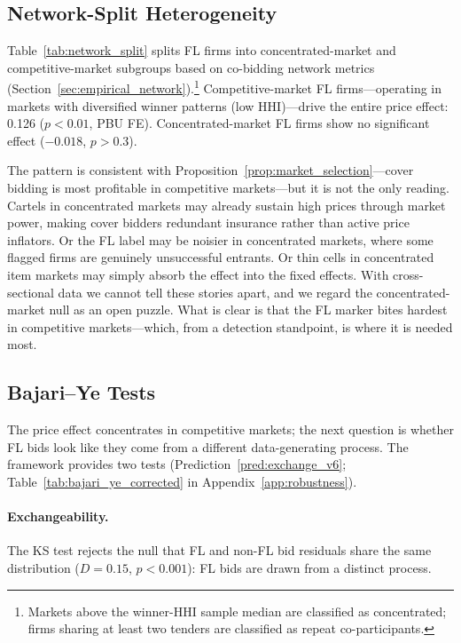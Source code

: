 \subsection{Network-Split Heterogeneity}
\label{sec:results_network}

Table~\ref{tab:network_split} splits FL firms into
concentrated-market and competitive-market subgroups based on
co-bidding network metrics (Section~\ref{sec:empirical_network}).\footnote{Markets
above the winner-HHI sample median are classified as concentrated;
firms sharing at least two tenders are classified as repeat
co-participants.}
Competitive-market FL firms---operating in markets with diversified
winner patterns (low HHI)---drive the entire price effect: 0.126
($p < 0.01$, PBU FE). Concentrated-market FL firms show no significant
effect ($-0.018$, $p > 0.3$).

The pattern is consistent with Proposition~\ref{prop:market_selection}---cover bidding is most profitable in
competitive markets---but it is not the only reading. Cartels in
concentrated markets may already sustain high prices through market
power, making cover bidders redundant insurance rather than active
price inflators. Or the FL label may be noisier in concentrated
markets, where some flagged firms are genuinely unsuccessful entrants.
Or thin cells in concentrated item markets may simply absorb the
effect into the fixed effects. With cross-sectional data we cannot
tell these stories apart, and we regard the concentrated-market null as
an open puzzle. What is clear is that the FL marker bites hardest in
competitive markets---which, from a detection standpoint, is where it
is needed most.



\subsection{Bajari--Ye Tests}
\label{sec:results_bajari}

The price effect concentrates in competitive markets; the next
question is whether FL bids look like they come from a different
data-generating process. The \citet{bajari2003deciding} framework
provides two tests
(Prediction~\ref{pred:exchange_v6};
Table~\ref{tab:bajari_ye_corrected} in Appendix~\ref{app:robustness}).

\paragraph{Exchangeability.}
The KS test rejects the null that FL and non-FL bid residuals share
the same distribution ($D = 0.15$, $p < 0.001$): FL bids are drawn
from a distinct process.

